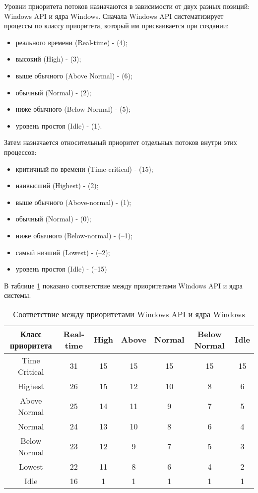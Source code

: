 Уровни приоритета потоков назначаются в зависимости от двух разных позиций: Windows API и ядра Windows.
\pagebreak
Сначала Windows API систематизирует процессы по классу приоритета, который им присваивается при создании:
\begin{itemize}[label*=---]
	\item реального времени (Real-time) - (4);
	\item высокий (High) - (3);
	\item выше обычного (Above Normal) - (6);
	\item обычный (Normal) - (2);
	\item ниже обычного (Below Normal) - (5);
	\item уровень простоя (Idle) - (1).
\end{itemize}

Затем назначается относительный приоритет отдельных потоков внутри этих процессов:
\begin{itemize}[label*=---]
	\item критичный по времени (Time-critical) - (15);
	\item наивысший (Highest) - (2);
	\item выше обычного (Above-normal) - (1);
	\item обычный (Normal) - (0);
	\item ниже обычного (Below-normal) - (–1);
	\item самый низший (Lowest) - (–2);
	\item уровень простоя (Idle) - (–15)
\end{itemize}

В таблице \ref{tab:prioritet} показано соответствие между приоритетами Windows API и ядра системы.

\begin{table}[!h]
	\caption{Соответствие между приоритетами Windows API и ядра Windows}
	\begin{center}
		\begin{tabular}{|c|c|c|c|c|c|c|}
			\hline
			Класс приоритета & Real-time & High & Above &
			Normal & Below Normal & Idle \\ \hline
			Time Critical & 31 & 15 & 15 & 15 & 15 & 15 \\ \hline
			Highest & 26 & 15 & 12 & 10 & 8 & 6 \\ \hline
			Above Normal & 25 & 14 & 11 & 9 & 7 & 5 \\ \hline
			Normal & 24 & 13 & 10 & 8 & 6 & 4 \\ \hline
			Below Normal & 23 & 12 & 9 & 7 & 5 & 3 \\ \hline
			Lowest & 22 & 11 & 8 & 6 & 4 & 2 \\ \hline
			Idle & 16 & 1 & 1 & 1 & 1 & 1 \\ \hline
		\end{tabular}
	\end{center}
	\label{tab:prioritet}
\end{table}

